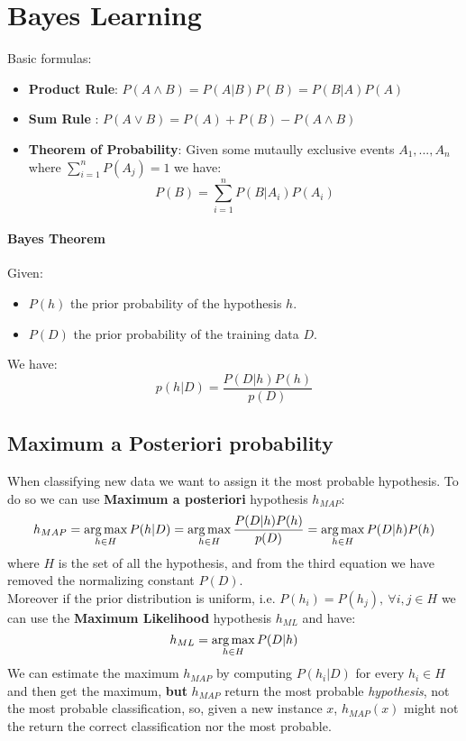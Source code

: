


\section{Bayes Learning}

Basic formulas:
\begin{itemize}
\item \textbf{Product Rule}: $P(A \wedge B)=P(A|B)P(B)=P(B|A)P(A)$
\item \textbf{Sum Rule} : $P(A \vee B)= P(A)+P(B)-P(A \wedge B)$
\item \textbf{Theorem of Probability}: Given some mutaully exclusive events $A_1,...,A_n$ where $\sum_{i=1}^n P(A_j)=1$ we have:
\[P(B) = \sum_{i=1}^n P(B|A_i)P(A_i)\]
\end{itemize}

\paragraph{Bayes Theorem}
Given:
\begin{itemize}
\item $P(h)$ the prior probability of the hypothesis $h$.
\item $P(D)$ the prior probability of the training data $D$.
\end{itemize}
We have:
\[p(h|D)=\frac{P(D|h)P(h)}{p(D)}\]

\subsection{Maximum a Posteriori probability}
When classifying new data we want to assign it the most probable hypothesis. To do so we can use \textbf{Maximum a posteriori} hypothesis $h_{MAP}$:
\[h_{MAP}=\operatorname*{arg\,max}_{h \in H}P(h|D)=\operatorname*{arg\,max}_{h \in H}\frac{P(D|h)P(h)}{p(D)}= \operatorname*{arg\,max}_{h \in H}P(D|h)P(h)\]
where $H$ is the set of all the hypothesis, and from the third equation we have removed the normalizing constant $P(D)$.\\
Moreover if the prior distribution is uniform, i.e. $P(h_i)=P(h_j),\ \forall i,j \in H$ we can use the \textbf{Maximum Likelihood} hypothesis $h_{ML}$ and have:
\[h_{ML}=\operatorname*{arg\,max}_{h \in H} P(D|h)\] 
We can estimate the maximum $h_{MAP}$ by computing $P(h_i|D)$ for every $h_i \in H$ and then get the maximum, \textbf{but} $h_{MAP}$ return the most probable \textit{hypothesis}, not the most probable classification, so, given a new instance $x$, $h_{MAP}(x)$ might not the return the correct classification nor the most probable.

